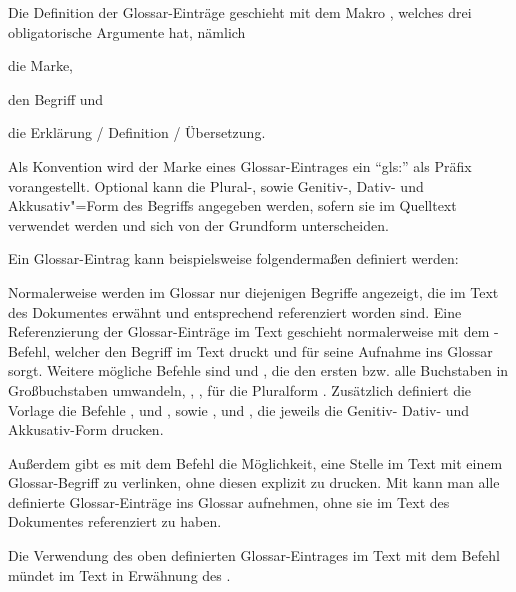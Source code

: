Die Definition der Glossar-Einträge geschieht mit dem Makro ,
welches drei obligatorische Argumente hat, nämlich
\begin{itemize*}
\item die Marke,
\item den Begriff und
\item die Erklärung / Definition / Übersetzung.
\end{itemize*}
Als Konvention wird der Marke eines Glossar-Eintrages ein \enquote{gls:} als Präfix vorangestellt.
Optional kann die Plural-, sowie Genitiv-, Dativ- und Akkusativ"=Form des Begriffs angegeben werden,
sofern sie im Quelltext verwendet werden und sich von der Grundform unterscheiden.

Ein Glossar-Eintrag kann beispielsweise folgendermaßen definiert werden:
\begin{latex}[caption={Definition eines Glossar-Eintrages},label={lst:GlossEntry}]
\end{latex}

Normalerweise werden im Glossar nur diejenigen Begriffe angezeigt,
die im Text des Dokumentes erwähnt und entsprechend referenziert worden sind.
Eine Referenzierung der Glossar-Einträge im Text geschieht normalerweise mit dem
-Befehl,
welcher den Begriff im Text druckt und für seine Aufnahme ins Glossar sorgt.
Weitere mögliche Befehle sind  und ,
die den ersten bzw. alle Buchstaben in Großbuchstaben umwandeln,
, ,  für die Pluralform \usw.
Zusätzlich definiert die Vorlage die Befehle
,  und , sowie
,  und ,
die jeweils die Genitiv- Dativ- und Akkusativ-Form drucken.

Außerdem gibt es mit dem Befehl  die Möglichkeit,
eine Stelle im Text mit einem Glossar-Begriff zu verlinken, ohne diesen explizit zu drucken.
Mit  kann man alle definierte Glossar-Einträge ins Glossar aufnehmen,
ohne sie im Text des Dokumentes referenziert zu haben.

Die Verwendung des oben definierten Glossar-Eintrages im Text mit dem Befehl
 mündet im Text in Erwähnung des .


